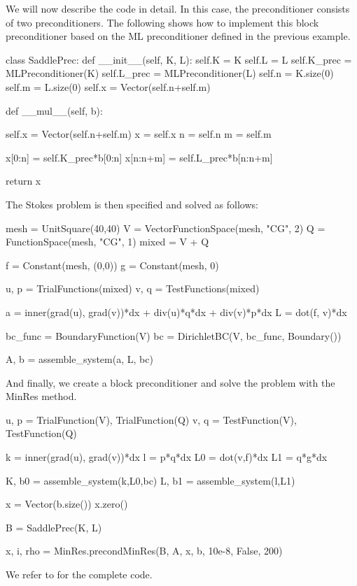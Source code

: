We will now describe the code in detail. 
In this case, the preconditioner consists of two preconditioners.
The following shows how to implement this block preconditioner
based on the ML preconditioner defined in the previous example.
\begin{python}
class SaddlePrec: 
    def __init__(self, K, L):  
        self.K = K
        self.L = L
        self.K_prec = MLPreconditioner(K)
        self.L_prec = MLPreconditioner(L)
        self.n = K.size(0)
        self.m = L.size(0)
        self.x = Vector(self.n+self.m)

    def __mul__(self, b):

        self.x = Vector(self.n+self.m)
        x = self.x 
        n = self.n
        m = self.m

        x[0:n]    = self.K_prec*b[0:n]
        x[n:n+m]  = self.L_prec*b[n:n+m] 

        return x 
\end{python}
The Stokes problem is then specified and solved as follows: 
\begin{python}
mesh = UnitSquare(40,40)
V = VectorFunctionSpace(mesh, "CG", 2)
Q = FunctionSpace(mesh, "CG", 1)
mixed = V + Q 

f = Constant(mesh, (0,0))
g = Constant(mesh, 0)

u, p = TrialFunctions(mixed) 
v, q = TestFunctions(mixed)

a = inner(grad(u), grad(v))*dx + div(u)*q*dx + div(v)*p*dx  
L = dot(f, v)*dx 

bc_func = BoundaryFunction(V)
bc = DirichletBC(V, bc_func, Boundary()) 

A, b = assemble_system(a, L, bc)
\end{python}
And finally, we create a block preconditioner and solve the problem with 
the MinRes method.
\begin{python}
u, p = TrialFunction(V), TrialFunction(Q)
v, q = TestFunction(V), TestFunction(Q)

k = inner(grad(u), grad(v))*dx 
l = p*q*dx 
L0 = dot(v,f)*dx 
L1 = q*g*dx 

K, b0 = assemble_system(k,L0,bc)
L, b1 = assemble_system(l,L1)

x = Vector(b.size())
x.zero()

B = SaddlePrec(K, L)

x, i, rho  = MinRes.precondMinRes(B, A, x, b, 10e-8, False, 200)
\end{python}
We refer to  for the complete code. 

